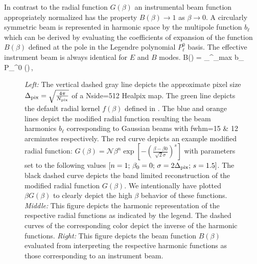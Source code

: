 In contrast to the radial function $G(\beta)$ an instrumental beam function appropriately normalized has the property $B(\beta) \rightarrow 1$ as $\beta \rightarrow 0$. A circularly symmetric beam is represented in harmonic space by the multipole function $b_{\ell}$ which can be derived by evaluating the coefficients of expansion of the function $B(\beta)$ defined at the pole in the Legendre polynomial $P_{\ell}^0$ basis. The effective instrument beam is  always identical for $E$ and $B$ modes. 
%
\beq
B(\beta) = \sum_{}^{\ell_{\rm max}}  b_{\ell} P_{\ell}^{0} (\cos{\beta})\,,
\eeq
%
%
\begin{figure}[!t] 
\centering
{}
\caption{\textit{Left:} The vertical dashed gray line depicts the approximate pixel size $\Delta_{\rm pix} = \sqrt{\frac{4 \pi}{N_{\rm pix}}}$ of a Nside=512 Healpix map. The green line depicts the default radial kernel $f(\beta)$ defined in . The blue and orange lines depict the modified radial function resulting the beam harmonics $b_{\ell}$ corresponding to Gaussian beams with fwhm=15 \& 12 arcminutes respectively. The red curve depicts an example modified radial function: $G(\beta)=\mathcal{N} \beta^n \exp{\left[ -\left( \frac{\beta-\beta0}{\sqrt{2} \sigma} \right)^s \right]}$ with parameters set to the following values $[n=1;\, \beta_0=0 ;\, \sigma = 2\Delta_{\rm pix} ;\, s=1.5]$. The black dashed curve depicts the band limited reconstruction of the modified radial function $G(\beta)$. We intentionally have plotted $\beta G(\beta)$ to clearly depict the high $\beta$ behavior of these functions. \textit{Middle: } This figure depicts the harmonic representation of the respective radial functions as indicated by the legend. The dashed curves of the corresponding color depict the inverse of the harmonic functions. \textit{Right:} This figure depicts the beam function $B(\beta)$ evaluated from interpreting the respective harmonic functions as those corresponding to an instrument beam.}
\label{fig:example_gbeta}
\end{figure}
